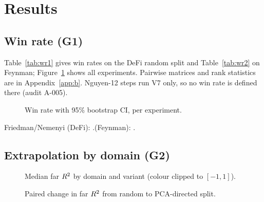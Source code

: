 \section{Results}\label{sec:results}
\ifx\datastatus{}\fi
\subsection{Win rate (G1)}
Table~\ref{tab:wr1} gives win rates on the DeFi random split and Table~\ref{tab:wr2} on Feynman; Figure~\ref{fig:wr} shows all experiments. Pairwise matrices and rank statistics are in Appendix~\ref{app:b}. Nguyen-12 steps run V7 only, so no win rate is defined there (audit A-005).
\begin{table}[t]\centering\scriptsize{}\caption{Win rate, DeFi random split.}\label{tab:wr1}\end{table}
\begin{table}[t]\centering\scriptsize{}\caption{Win rate, Feynman.}\label{tab:wr2}\end{table}
\begin{figure}[t]\centering{}\caption{Win rate with 95\% bootstrap CI, per experiment.}\label{fig:wr}\end{figure}
Friedman/Nemenyi (DeFi): .\quad (Feynman): .
\begin{table}[t]\centering\scriptsize{}\caption{Near-perfect and catastrophic rates, DeFi.}\label{tab:rates}\end{table}
\begin{table}[t]\centering\scriptsize{}\caption{Gate decision shares.}\label{tab:gate}\end{table}
\subsection{Extrapolation by domain (G2)}
\begin{table}[t]\centering\scriptsize{}\caption{Median [IQR] of $\rfar$ by domain, DeFi random split.}\label{tab:dom1}\end{table}
\begin{table}[t]\centering\scriptsize{}\caption{Same, PCA-directed split.}\label{tab:dom2}\end{table}
\begin{table}[t]\centering\scriptsize{}\caption{Same, Feynman domains.}\label{tab:dom3}\end{table}
\begin{figure}[t]\centering{}\caption{Median far $R^2$ by domain and variant (colour clipped to $[-1,1]$).}\label{fig:heat}\end{figure}
\begin{figure}[t]\centering{}\caption{Paired change in far $R^2$ from random to PCA-directed split.}\label{fig:pca}\end{figure}
